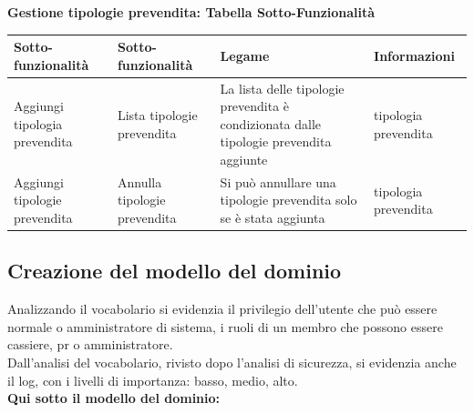 \documentclass[a4paper]{article}
\begin{document}
\textbf{Gestione tipologie prevendita: Tabella Sotto-Funzionalità}

\begin{center}
    \begin{tabularx}{1\textwidth}{|X|X|X|X|}
    \hline
    \textbf{Sotto-funzionalità} & \textbf{Sotto-funzionalità} & \textbf{Legame} & \textbf{Informazioni}\\
    \hline
    \hline
    Aggiungi tipologia prevendita & Lista tipologie prevendita & La lista delle tipologie prevendita è condizionata dalle tipologie prevendita aggiunte & tipologia prevendita\\
    \hline
    Aggiungi tipologie prevendita & Annulla tipologie prevendita & Si può annullare una tipologie prevendita solo se è stata aggiunta & tipologia prevendita\\
    \hline
    \end{tabularx}
\end{center}

\newpage

\subsection{Creazione del modello del dominio}

Analizzando il vocabolario si evidenzia il privilegio dell'utente che può essere normale o amministratore di sistema, i ruoli di un membro che possono essere cassiere, pr o amministratore.\\Dall'analisi del vocabolario, rivisto dopo l'analisi di sicurezza, si evidenzia anche il log, con i livelli di importanza: basso, medio, alto.\\\textbf{Qui sotto il modello del dominio:}\\



\end{document}

